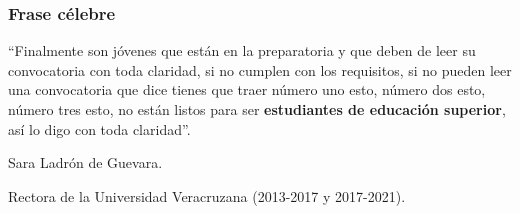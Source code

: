 \documentclass[aspectratio=169]{beamer}
\begin{document}
\begin{frame}
\frametitle{Frase célebre}
``Finalmente son jóvenes que están en la preparatoria y que deben de leer su convocatoria con toda claridad, si no cumplen con los requisitos, si no pueden leer una convocatoria que dice tienes que traer número uno esto, número dos esto, número tres esto, no están listos para ser \textbf{estudiantes de educación superior}, así lo digo con toda claridad''.

Sara Ladrón de Guevara.

Rectora de la Universidad Veracruzana (2013-2017 y 2017-2021).

\end{frame}





\end{document}
